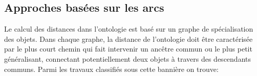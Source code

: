   \subsection{Approches basées sur les arcs}
  \label{sec:semantic-sim:arcs}

  Le calcul des distances dans l’ontologie est basé sur un graphe de
  spécialisation des objets.  Dans chaque graphe, la distance de
  l’ontologie doit être caractérisée par le plus court chemin qui fait
  intervenir un ancêtre commun ou le plus petit généralisant,
  connectant potentiellement deux objets à travers des descendants
  communs. Parmi les travaux classifiés sous cette bannière on trouve:\\

  \renewcommand{\descriptionlabel}[1]{\hspace{1cm}\textbullet~\textsf{#1}}
